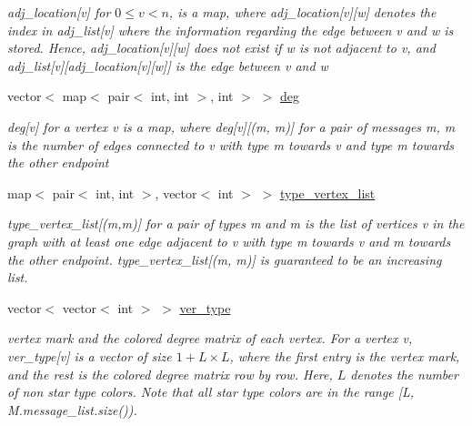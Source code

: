 \begin{DoxyCompactItemize}
\begin{DoxyCompactList}\small\item\em adj\+\_\+location\mbox{[}v\mbox{]} for $0 \leq v < n$, is a map, where adj\+\_\+location\mbox{[}v\mbox{]}\mbox{[}w\mbox{]} denotes the index in adj\+\_\+list\mbox{[}v\mbox{]} where the information regarding the edge between v and w is stored. Hence, adj\+\_\+location\mbox{[}v\mbox{]}\mbox{[}w\mbox{]} does not exist if w is not adjacent to v, and adj\+\_\+list\mbox{[}v\mbox{]}\mbox{[}adj\+\_\+location\mbox{[}v\mbox{]}\mbox{[}w\mbox{]}\mbox{]} is the edge between v and w \end{DoxyCompactList}\item 
vector$<$ map$<$ pair$<$ int, int $>$, int $>$ $>$ \hyperlink{classcolored__graph_ae3269d35c1b022bc70d195bebd4e1b8a}{deg}
\begin{DoxyCompactList}\small\item\em deg\mbox{[}v\mbox{]} for a vertex v is a map, where deg\mbox{[}v\mbox{]}\mbox{[}(m, m\textquotesingle{})\mbox{]} for a pair of messages m, m\textquotesingle{} is the number of edges connected to v with type m towards v and type m\textquotesingle{} towards the other endpoint \end{DoxyCompactList}\item 
map$<$ pair$<$ int, int $>$, vector$<$ int $>$ $>$ \hyperlink{classcolored__graph_a8a7e4022653cdcda00155e106d8914f6}{type\+\_\+vertex\+\_\+list}
\begin{DoxyCompactList}\small\item\em type\+\_\+vertex\+\_\+list\mbox{[}(m,m\textquotesingle{})\mbox{]} for a pair of types m and m\textquotesingle{} is the list of vertices v in the graph with at least one edge adjacent to v with type m towards v and m\textquotesingle{} towards the other endpoint. type\+\_\+vertex\+\_\+list\mbox{[}(m, m\textquotesingle{})\mbox{]} is guaranteed to be an increasing list. \end{DoxyCompactList}\item 
vector$<$ vector$<$ int $>$ $>$ \hyperlink{classcolored__graph_a2cc32e7146fa3319f83cfa940f5e1be4}{ver\+\_\+type}
\begin{DoxyCompactList}\small\item\em vertex mark and the colored degree matrix of each vertex. For a vertex v, ver\+\_\+type\mbox{[}v\mbox{]} is a vector of size $1 + L \times L$, where the first entry is the vertex mark, and the rest is the colored degree matrix row by row. Here, $L$ denotes the number of non star type colors. Note that all star type colors are in the range \mbox{[}L, M.\+message\+\_\+list.\+size()). \end{DoxyCompactList}\item 

\end{DoxyCompactItemize}
